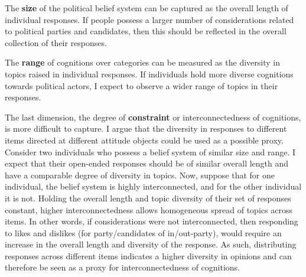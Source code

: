 \documentclass[12pt]{article}
\begin{document}

The \textbf{size} of the political belief system can be captured as the overall length of individual responses. If people possess a larger number of considerations related to political parties and candidates, then this should be reflected in the  overall collection of their responses.

The \textbf{range} of cognitions over categories can be measured as the diversity in topics raised in individual responses. If individuals hold more diverse cognitions towards political actors, I expect to observe a wider range of topics in their responses.

The last dimension, the degree of \textbf{constraint} or interconnectedness of cognitions, is more difficult to capture. I argue that the diversity in responses to different items directed at different attitude objects could be used as a possible proxy. Consider two individuals who possess a belief system of similar size and range. I expect that their open-ended responses should be of similar overall length and have a comparable degree of diversity in topics. Now, suppose that for one individual, the belief system is highly interconnected, and for the other individual it is not. Holding the overall length and topic diversity of their set of responses constant, higher interconnectedness allows homogeneous spread of topics across items. In other words, if considerations were not interconnected, then responding to likes and dislikes (for party/candidates of in/out-party), would require an increase in the overall length and diversity of the response. As such, distributing responses across different items indicates a higher diversity in opinions and can therefore be seen as a proxy for interconnectedness of cognitions.
\end{document}
